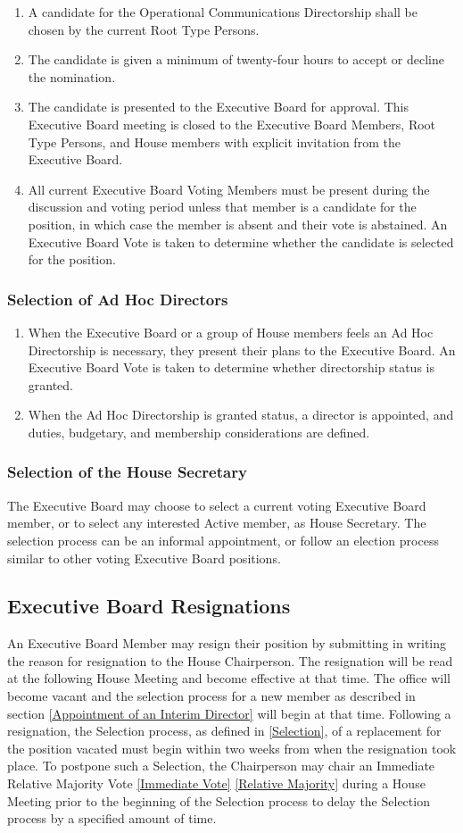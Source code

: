 \documentclass{article}
\newcommand{\asection}[1]{\subsection{#1} \label{#1}}
\newcommand{\asubsection}[1]{\subsubsection{#1} \label{#1}}
\begin{document}
\begin{enumerate}
	\item A candidate for the Operational Communications Directorship shall be chosen by the current Root Type Persons.
	\item The candidate is given a minimum of twenty-four hours to accept or decline the nomination.
	\item The candidate is presented to the Executive Board for approval.
		This Executive Board meeting is closed to the Executive Board Members, Root Type Persons, and House members with explicit invitation from the Executive Board.
	\item All current Executive Board Voting Members must be present during the discussion and voting period unless that member is a candidate for the position, in which case the member is absent and their vote is abstained.
		An Executive Board Vote is taken to determine whether the candidate is selected for the position.
\end{enumerate}
\asubsection{Selection of Ad Hoc Directors}
\begin{enumerate}
	\item When the Executive Board or a group of House members feels an Ad Hoc Directorship is necessary, they present their plans to the Executive Board.
  An Executive Board Vote is taken to determine whether directorship status is granted.
	\item When the Ad Hoc Directorship is granted status, a director is appointed, and duties, budgetary, and membership considerations are defined.
\end{enumerate}
\asubsection{Selection of the House Secretary}
The Executive Board may choose to select a current voting Executive Board member, or to select any interested Active member, as House Secretary.
The selection process can be an informal appointment, or follow an election process similar to other voting Executive Board positions.

\asection{Executive Board Resignations}
An Executive Board Member may resign their position by submitting in writing the reason for resignation to the House Chairperson.
The resignation will be read at the following House Meeting and become effective at that time.
The office will become vacant and the selection process for a new member as described in section \ref{Appointment of an Interim Director} will begin at that time.
Following a resignation, the Selection process, as defined in \ref{Selection}, of a replacement for the position vacated must begin within two weeks from when the resignation took place.
To postpone such a Selection, the Chairperson may chair an Immediate Relative Majority Vote \ref{Immediate Vote} \ref{Relative Majority} during a House Meeting prior to the beginning of the Selection process to delay the Selection process by a specified amount of time.
\end{document}
